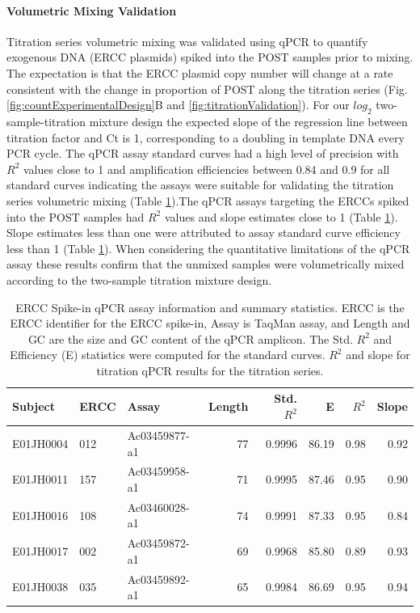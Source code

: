 \documentclass[linenumbers]{bmcart}
\begin{document}
\paragraph*{Volumetric Mixing Validation}

Titration series volumetric mixing was validated using qPCR to quantify exogenous
DNA (ERCC plasmids) spiked into the POST samples prior to mixing.
The expectation is that the ERCC plasmid copy number will change at a rate consistent
with the change in proportion of POST along the titration series (Fig. \ref{fig:countExperimentalDesign}B and \ref{fig:titrationValidation}).
For our \(log_2\) two-sample-titration mixture design the expected slope of the
regression line between titration factor and Ct is 1, corresponding to a
doubling in template DNA every PCR cycle. The qPCR assay
standard curves had a high level of precision with \(R^2\) values close
to 1 and amplification efficiencies between 0.84 and 0.9 for all
standard curves indicating the assays were suitable for validating the
titration series volumetric mixing (Table \ref{tab:erccTable}).The qPCR assays targeting the
ERCCs spiked into the POST samples had \(R^2\) values and slope
estimates close to 1 (Table \ref{tab:erccTable}). Slope estimates less
than one were attributed to assay standard curve efficiency less than 1
(Table \ref{tab:erccTable}). When considering the
quantitative limitations of the qPCR assay these results confirm that
the unmixed samples were volumetrically mixed according to the
two-sample titration mixture design.

\begin{table}

\caption{\label{tab:erccTable}ERCC Spike-in qPCR assay information and summary statistics. ERCC is the ERCC identifier for the ERCC spike-in, Assay is TaqMan assay, and Length and GC are the size and GC content of the qPCR amplicon.  The Std. $R^2$ and Efficiency (E) statistics were computed for the standard curves. $R^2$ and slope for titration qPCR results for the titration series.}
\centering
\begin{tabular}[t]{lllrrrrr}
\toprule
Subject & ERCC & Assay & Length & Std. $R^2$ & E & $R^2$ & Slope\\
\midrule
E01JH0004 & 012 & Ac03459877-a1 & 77 & 0.9996 & 86.19 & 0.98 & 0.92\\
E01JH0011 & 157 & Ac03459958-a1 & 71 & 0.9995 & 87.46 & 0.95 & 0.90\\
E01JH0016 & 108 & Ac03460028-a1 & 74 & 0.9991 & 87.33 & 0.95 & 0.84\\
E01JH0017 & 002 & Ac03459872-a1 & 69 & 0.9968 & 85.80 & 0.89 & 0.93\\
E01JH0038 & 035 & Ac03459892-a1 & 65 & 0.9984 & 86.69 & 0.95 & 0.94\\
\bottomrule
\end{tabular}
\end{table}
\end{document}
